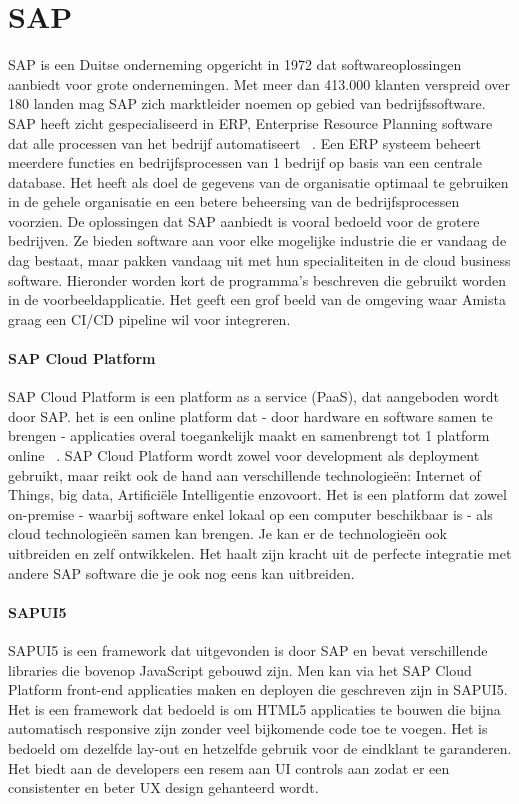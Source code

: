 \section{SAP}
\label{sec:sap}
    SAP is een Duitse onderneming opgericht in 1972 dat softwareoplossingen aanbiedt voor grote ondernemingen. Met meer dan 413.000 klanten verspreid over 180 landen mag SAP zich marktleider noemen op gebied van bedrijfssoftware.
    SAP heeft zicht gespecialiseerd in ERP, Enterprise Resource Planning software dat alle processen van het bedrijf automatiseert ~\autocite{SAPERP2019}. Een ERP systeem beheert meerdere functies en bedrijfsprocessen van 1 bedrijf op basis van een centrale database. Het heeft als doel de gegevens van de organisatie optimaal te gebruiken in de gehele organisatie en een betere beheersing van de bedrijfsprocessen voorzien.
    De oplossingen dat SAP aanbiedt is vooral bedoeld voor de grotere bedrijven. Ze bieden software aan voor elke mogelijke industrie die er vandaag de dag bestaat, maar pakken vandaag uit met hun specialiteiten in de cloud business software.
    Hieronder worden kort de programma's beschreven die gebruikt worden in de voorbeeldapplicatie. Het geeft een grof beeld van de omgeving waar Amista graag een CI/CD pipeline wil voor integreren.
     
    \paragraph{SAP Cloud Platform}
    SAP Cloud Platform is een platform as a service (PaaS), dat aangeboden wordt door SAP. het is een online platform dat - door hardware en software samen te brengen - applicaties overal toegankelijk maakt en samenbrengt tot 1 platform online ~\autocite{SAPSE2018}.
    SAP Cloud Platform wordt zowel voor development als deployment gebruikt, maar reikt ook de hand aan verschillende technologieën: Internet of Things, big data, Artificiële Intelligentie enzovoort. Het is een platform dat zowel on-premise - waarbij software enkel lokaal op een computer beschikbaar is - als cloud technologieën samen kan brengen. Je kan er de technologieën ook uitbreiden en zelf ontwikkelen. Het haalt zijn kracht uit de perfecte integratie met andere SAP software die je ook nog eens kan uitbreiden.
    
    \paragraph{SAPUI5}
    SAPUI5 is een framework dat uitgevonden is door SAP en bevat verschillende libraries die bovenop JavaScript gebouwd zijn. Men kan via het SAP Cloud Platform front-end applicaties maken en deployen die geschreven zijn in SAPUI5. Het is een framework dat bedoeld is om HTML5 applicaties te bouwen die bijna automatisch responsive zijn zonder veel bijkomende code toe te voegen.
    Het is bedoeld om dezelfde lay-out en hetzelfde gebruik voor de eindklant te garanderen. Het biedt aan de developers een resem aan UI controls aan zodat er een consistenter en beter UX design gehanteerd wordt.~\autocite{SAPSEa} 
    
